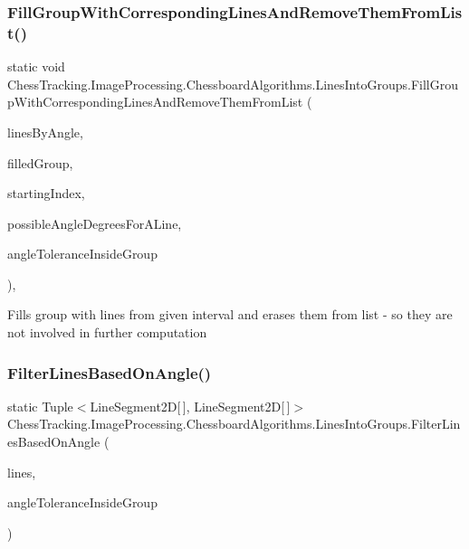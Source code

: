 \subsubsection{\texorpdfstring{FillGroupWithCorrespondingLinesAndRemoveThemFromList()}{FillGroupWithCorrespondingLinesAndRemoveThemFromList()}}
{\footnotesize\ttfamily static void Chess\+Tracking.\+Image\+Processing.\+Chessboard\+Algorithms.\+Lines\+Into\+Groups.\+Fill\+Group\+With\+Corresponding\+Lines\+And\+Remove\+Them\+From\+List (\begin{DoxyParamCaption}\item[{List$<$ Line\+Segment2D $>$ \mbox{[}$\,$\mbox{]}}]{lines\+By\+Angle,  }\item[{List$<$ Line\+Segment2D $>$}]{filled\+Group,  }\item[{int}]{starting\+Index,  }\item[{int}]{possible\+Angle\+Degrees\+For\+A\+Line,  }\item[{int}]{angle\+Tolerance\+Inside\+Group }\end{DoxyParamCaption})\hspace{0.3cm}{\ttfamily [static]}, {\ttfamily [private]}}



Fills group with lines from given interval and erases them from list -\/ so they are not involved in further computation 

\mbox{\label{class_chess_tracking_1_1_image_processing_1_1_chessboard_algorithms_1_1_lines_into_groups_ac4ffd31e5dee74421cfe9255d5144aea}} 
\subsubsection{\texorpdfstring{FilterLinesBasedOnAngle()}{FilterLinesBasedOnAngle()}}
{\footnotesize\ttfamily static Tuple$<$Line\+Segment2D\mbox{[}$\,$\mbox{]}, Line\+Segment2D\mbox{[}$\,$\mbox{]}$>$ Chess\+Tracking.\+Image\+Processing.\+Chessboard\+Algorithms.\+Lines\+Into\+Groups.\+Filter\+Lines\+Based\+On\+Angle (\begin{DoxyParamCaption}\item[{Line\+Segment2D \mbox{[}$\,$\mbox{]}}]{lines,  }\item[{int}]{angle\+Tolerance\+Inside\+Group }\end{DoxyParamCaption})\hspace{0.3cm}{\ttfamily [static]}}



